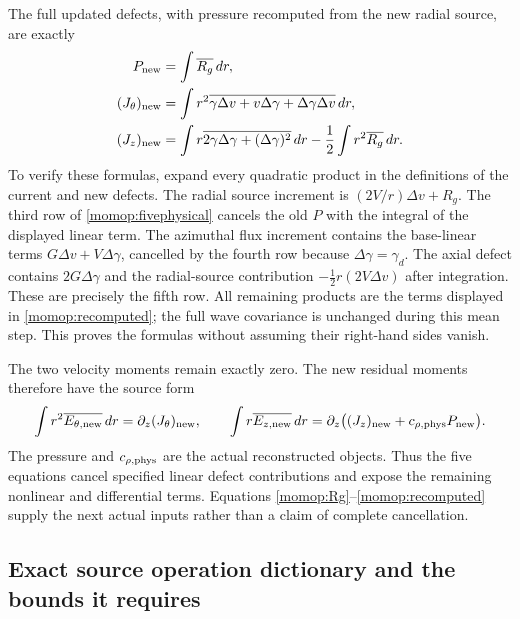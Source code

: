 The full updated defects, with pressure recomputed from the new
radial source, are exactly
\begin{align}
 P_{\rm new}&=\int\overline{R_g}\,dr,\nonumber\\
 (J_\theta)_{\rm new}
    &=\int r^2\overline{\gamma\Delta v+v\Delta\gamma+
                                      \Delta\gamma\Delta v}\,dr,\nonumber\\
 (J_z)_{\rm new}
    &=\int r\overline{2\gamma\Delta\gamma+(\Delta\gamma)^2}\,dr
                      -\frac12\int r^2\overline{R_g}\,dr .
 \label{momop:recomputed}
\end{align}
To verify these formulas, expand every quadratic product in the
definitions of the current and new defects. The radial source
increment is $(2V/r)\Delta v+R_g$. The third row of
\eqref{momop:fivephysical} cancels the old $P$ with the integral
of the displayed linear term. The azimuthal flux increment contains
the base-linear terms $G\Delta v+V\Delta\gamma$, cancelled by
the fourth row because $\Delta\gamma=\gamma_d$. The axial defect
contains $2G\Delta\gamma$ and the radial-source contribution
$-\tfrac12r(2V\Delta v)$ after integration. These are precisely
the fifth row. All remaining products are the terms displayed
in \eqref{momop:recomputed}; the full wave covariance is unchanged
during this mean step. This proves the formulas without assuming
their right-hand sides vanish.

The two velocity moments remain exactly zero. The new residual
moments therefore have the source form
\[
 \int r^2\overline{E_{\theta,\rm new}}\,dr
       =\partial_z(J_\theta)_{\rm new},\qquad
 \int r\overline{E_{z,\rm new}}\,dr
       =\partial_z\bigl((J_z)_{\rm new}
                           +c_{\rho,\rm phys}P_{\rm new}\bigr).
\]
The pressure and $c_{\rho,\rm phys}$ are the actual reconstructed
objects. Thus the five equations cancel specified linear defect
contributions and expose the remaining nonlinear and differential
terms. Equations \eqref{momop:Rg}--\eqref{momop:recomputed} supply
the next actual inputs rather than a claim of complete cancellation.

\subsection{Exact source operation dictionary and the bounds it requires}

